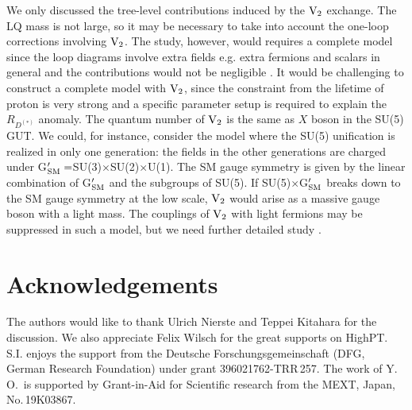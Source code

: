 \documentclass[12pt, a4paper]{article}
\numberwithin{equation}{section} %
\newcommand{\1}{\mbox{1}\hspace{-0.25em}\mbox{l}}
\begin{document}
We only discussed the tree-level contributions induced by the $\rm{V}_2$ exchange.
The LQ mass is not large, so it may be necessary to take into account the one-loop corrections involving $\rm{V}_2$. The study, however, would requires a complete model since the loop diagrams involve extra fields e.g. extra fermions and scalars in general and the contributions would not be negligible \cite{Iguro:2022ozl}. 
It would be challenging to construct a complete model with $\rm{V}_2$, since the constraint from the lifetime of proton is very strong and a specific parameter setup is required to explain the $R_{D^{(*)}}$ anomaly.
The quantum number of $\rm{V}_2$ is the same as $X$ boson in the SU(5) GUT.
We could, for instance, consider the model where the SU(5) unification is realized in only one generation: the fields in the other generations are charged under G$^\prime_{\rm SM}=$SU(3)$\times$SU(2)$\times$U(1).
The SM gauge symmetry is given by the linear combination of G$^\prime_{\rm SM}$ and the subgroups of SU(5).
If SU(5)$\times$G$^\prime_{\rm SM}$ breaks down to the SM gauge symmetry at the low scale, 
$\rm{V}_2$ would arise as a massive gauge boson with a light mass.
The couplings of $\rm{V}_2$ with light fermions may be suppressed in such a model, but we need further detailed study \cite{IOprojectNo17}.


\section*{Acknowledgements}
The authors would like to thank Ulrich Nierste and Teppei Kitahara for the discussion.
We also appreciate Felix Wilsch for the great supports on HighPT.
S.I. enjoys the support from the Deutsche Forschungsgemeinschaft (DFG, German Research Foundation) under grant 396021762-TRR\,257.
The work of Y.\,O.~is supported by Grant-in-Aid for Scientific research from the MEXT, Japan, No.\,19K03867.

\small{


}
\end{document}
